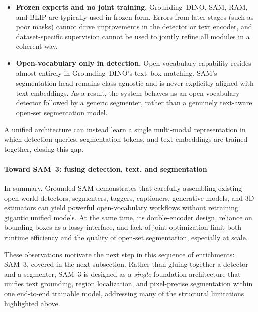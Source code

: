 \begin{enrichment}
\begin{enrichment}
		\begin{itemize}
			\item \textbf{Frozen experts and no joint training.}
			Grounding~DINO, SAM, RAM, and BLIP are typically used in frozen form.
			Errors from later stages (such as poor masks) cannot drive improvements in the detector or text encoder, and dataset-specific supervision cannot be used to jointly refine all modules in a coherent way.
			\item \textbf{Open-vocabulary only in detection.}
			Open-vocabulary capability resides almost entirely in Grounding~DINO’s text–box matching.
			SAM’s segmentation head remains class-agnostic and is never explicitly aligned with text embeddings.
			As a result, the system behaves as an open-vocabulary detector followed by a generic segmenter, rather than a genuinely text-aware open-set segmentation model.
		\end{itemize}
		
		A unified architecture can instead learn a single multi-modal representation in which detection queries, segmentation tokens, and text embeddings are trained together, closing this gap.
		
		\paragraph{Toward SAM~3: fusing detection, text, and segmentation}
		In summary, Grounded SAM demonstrates that carefully assembling existing open-world detectors, segmenters, taggers, captioners, generative models, and 3D estimators can yield powerful open-vocabulary workflows without retraining gigantic unified models.
		At the same time, its double-encoder design, reliance on bounding boxes as a lossy interface, and lack of joint optimization limit both runtime efficiency and the quality of open-set segmentation, especially at scale.
		
		These observations motivate the next step in this sequence of enrichments: SAM~3, covered in the next subsection.
		Rather than gluing together a detector and a segmenter, SAM~3 is designed as a \emph{single} foundation architecture that unifies text grounding, region localization, and pixel-precise segmentation within one end-to-end trainable model, addressing many of the structural limitations highlighted above.
		
	\end{enrichment}
	
	\newpage
	
	\begin{enrichment}
		\label{enr:subsec_chapter15_sam3}
		

\end{enrichment}
\end{enrichment}
